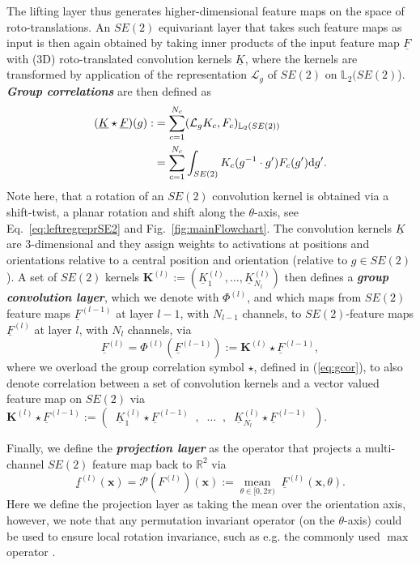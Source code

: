 \documentclass[twocolumn,final]{article}
\begin{document}
The lifting layer thus generates higher-dimensional feature maps on the space of roto-translations. An $SE(2)$ equivariant layer that takes such feature maps as input is then again obtained by taking inner products of the input feature map $\underline{F}$ with (3D) roto-translated convolution kernels $\underline{K}$, where the kernels are transformed by application of the representation $\mathcal{L}_g$ of $SE(2)$ on $\mathbb{L}_2(SE(2)$).
\textbf{\emph{Group correlations}} are then defined as
\begin{align}
(\underline{K} \star \underline{F})(g) 
:&= \sum\limits_{c=1}^{N_c} ( \mathcal{L}_g K_c, F_c )_{\mathbb{L}_2(SE(2))} \label{eq:gcor}  \\
&= \sum\limits_{c=1}^{N_c} \int_{SE(2)} K_c(g^{-1} \cdot g') F_c(g') {\rm d}g'. \nonumber 
\end{align}
Note here, that a rotation of an $SE(2)$ convolution kernel is obtained via a shift-twist, a planar rotation and shift along the $\theta$-axis, see Eq.~\eqref{eq:leftregreprSE2} and Fig.~\ref{fig:mainFlowchart}. The convolution kernels $\underline{K}$ are 3-dimensional and they assign weights to activations at positions and orientations relative to a central position and orientation (relative to $g \in SE(2)$). A set of $SE(2)$ kernels $\mathbf{K}^{(l)} := (\underline{K}_1^{(l)},\dots,\underline{K}_{N_l}^{(l)})$ then defines a \textbf{\emph{group convolution layer}}, which we denote with $\Phi^{(l)}$, and which maps from $SE(2)$ feature maps $\underline{F}^{(l-1)}$ at layer $l-1$, with $N_{l-1}$ channels, to $SE(2)$-feature maps $\underline{F}^{(l)}$ at layer $l$, with $N_{l}$ channels, via
\begin{equation}\label{eq:groupConvLayer}
\underline{F}^{(l)} = \Phi^{(l)}(\underline{F}^{(l-1)}) :=
\mathbf{K}^{(l)} {\star} \underline{F}^{(l-1)},
\end{equation}
where we overload the group correlation symbol $\star$, defined in (\ref{eq:gcor}), to also denote correlation between a set of convolution kernels and a vector valued feature map on $SE(2)$ via $\mathbf{K}^{(l)} \star \underline{F}^{(l-1)} := 
\left(\;\; 
\underline{K}_{1}^{(l)} {\star} \underline{F}^{(l-1)} \;\;,\;\;
\dots \;\;,\;\;
\underline{K}_{N_{l}}^{(l)} {\star} \underline{F}^{(l-1)} 
\;\;\right).$

Finally, we define the \textbf{\emph{projection layer}} as the operator that projects a multi-channel $SE(2)$ feature map back to $\mathbb{R}^2$ via
\begin{equation}\label{eq:projectionLayer}
\underline{f}^{(l)}(\mathbf{x}) = \mathcal{P}(F^{(l)})(\mathbf{x}) := \underset{\theta \in [0,2\pi)}{\operatorname{mean}} \; \underline{F}^{(l)}(\mathbf{x},\theta).
\end{equation}
Here we define the projection layer as taking the mean over the orientation axis, however, we note that any permutation invariant operator (on the $\theta$-axis) could be used to ensure local rotation invariance, such as e.g. the commonly used $\operatorname{max}$ operator \citep{cohen2016group,bekkers2018roto}.
\end{document}
